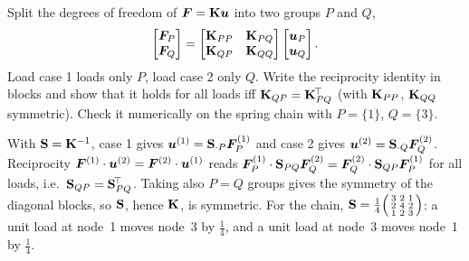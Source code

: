 \label{exo:reciprocity}
Split the degrees of freedom of $\bm{F}=\mathbf{K}\bm{u}$ into two groups $P$ and $Q$,
\[
  \begin{bmatrix}\bm{F}_P\\ \bm{F}_Q\end{bmatrix}=
  \begin{bmatrix}\mathbf{K}_{PP}&\mathbf{K}_{PQ}\\ \mathbf{K}_{QP}&\mathbf{K}_{QQ}\end{bmatrix}
  \begin{bmatrix}\bm{u}_P\\ \bm{u}_Q\end{bmatrix}.
\]
Load case 1 loads only $P$, load case 2 only $Q$. Write the reciprocity
identity in blocks and show that it holds for all loads iff
$\mathbf{K}_{QP}=\mathbf{K}_{PQ}^{\!\top}$ (with $\mathbf{K}_{PP}$, $\mathbf{K}_{QQ}$ symmetric).
Check it numerically on the spring chain with $P=\{1\}$, $Q=\{3\}$.
\begin{solution}
With $\mathbf{S}=\mathbf{K}^{-1}$, case 1 gives $\bm{u}^{(1)}=\mathbf{S}_{\cdot P}\bm{F}_P^{(1)}$
and case 2 gives $\bm{u}^{(2)}=\mathbf{S}_{\cdot Q}\bm{F}_Q^{(2)}$. Reciprocity
$\bm{F}^{(1)}\cdot\bm{u}^{(2)}=\bm{F}^{(2)}\cdot\bm{u}^{(1)}$ reads
$\bm{F}_P^{(1)}\cdot\mathbf{S}_{PQ}\bm{F}_Q^{(2)}=\bm{F}_Q^{(2)}\cdot\mathbf{S}_{QP}\bm{F}_P^{(1)}$
for all loads, i.e.\ $\mathbf{S}_{QP}=\mathbf{S}_{PQ}^{\!\top}$. Taking also $P=Q$ groups
gives the symmetry of the diagonal blocks, so $\mathbf{S}$, hence $\mathbf{K}$, is
symmetric. For the chain, $\mathbf{S}=\tfrac14\begin{psmallmatrix}3&2&1\\2&4&2\\1&2&3\end{psmallmatrix}$:
a unit load at node~1 moves node~3 by $\tfrac14$, and a unit load at node~3
moves node~1 by $\tfrac14$.
\end{solution}

